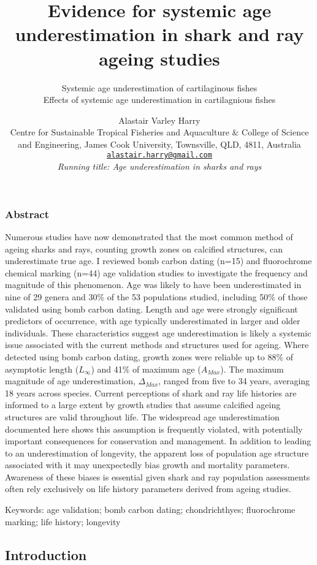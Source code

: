 \documentclass[]{article}
\title{Evidence for systemic age underestimation in shark and ray ageing
studies}
\subtitle{Systemic age underestimation of cartilaginous fishes\\
Effects of systemic age underestimation in cartilagnious fishes}
\author{Alastair Varley Harry\\
Centre for Sustainable Tropical Fisheries and Aquaculture \& College of
Science and Engineering, James Cook University, Townsville, QLD, 4811,
Australia\\
\href{mailto:alastair.harry@gmail.com}{\nolinkurl{alastair.harry@gmail.com}}\\
\emph{Running title: Age underestimation in sharks and rays}}
\date{}
\begin{document}
\maketitle

\newpage

\subsubsection{Abstract}\label{abstract}

Numerous studies have now demonstrated that the most common method of
ageing sharks and rays, counting growth zones on calcified structures,
can underestimate true age. I reviewed bomb carbon dating (n=15) and
fluorochrome chemical marking (n=44) age validation studies to
investigate the frequency and magnitude of this phenomenon. Age was
likely to have been underestimated in nine of 29 genera and 30\% of the
53 populations studied, including 50\% of those validated using bomb
carbon dating. Length and age were strongly significant predictors of
occurrence, with age typically underestimated in larger and older
individuals. These characteristics suggest age underestimation is likely
a systemic issue associated with the current methods and structures used
for ageing. Where detected using bomb carbon dating, growth zones were
reliable up to 88\% of asymptotic length (\(L_\infty\)) and 41\% of
maximum age (\(A_{Max}\)). The maximum magnitude of age underestimation,
\(\Delta_{Max}\), ranged from five to 34 years, averaging 18 years
across species. Current perceptions of shark and ray life histories are
informed to a large extent by growth studies that assume calcified
ageing structures are valid throughout life. The widespread age
underestimation documented here shows this assumption is frequently
violated, with potentially important consequences for conservation and
management. In addition to leading to an underestimation of longevity,
the apparent loss of population age structure associated with it may
unexpectedly bias growth and mortality parameters. Awareness of these
biases is essential given shark and ray population assessments often
rely exclusively on life history parameters derived from ageing studies.

Keywords: age validation; bomb carbon dating; chondrichthyes;
fluorochrome marking; life history; longevity

\newpage

\tableofcontents

\newpage

\subsection{Introduction}\label{introduction}
\end{document}
